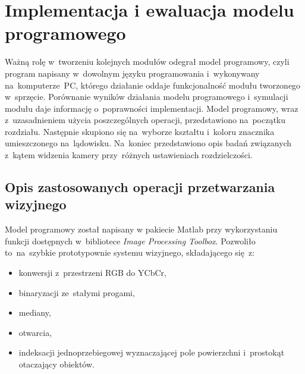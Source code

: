 \chapter{Implementacja i ewaluacja modelu programowego}
\label{cha:implementacja_modelu}

Ważną rolę w~tworzeniu kolejnych modułów odegrał model programowy, czyli program napisany w~dowolnym języku programowania i~wykonywany na~komputerze~PC, którego działanie oddaje funkcjonalność modułu tworzonego w~sprzęcie.
Porównanie wyników działania modelu programowego i~symulacji modułu daje informację o~poprawności implementacji. 
Model programowy, wraz z~uzasadnieniem użycia poszczególnych operacji, przedstawiono na~początku rozdziału.
Następnie skupiono się na~wyborze kształtu i~koloru znacznika umieszczonego na~lądowisku.
Na~koniec przedstawiono opis badań związanych z~kątem widzenia kamery przy~różnych ustawieniach rozdzielczości.

\section{Opis zastosowanych operacji przetwarzania wizyjnego}
\label{sec:opis_operacji}
Model programowy został napisany w pakiecie Matlab przy wykorzystaniu funkcji dostępnych w~bibliotece \textit{Image Processing Toolbox}. 
Pozwoliło to~na~szybkie prototypownie systemu wizyjnego, składającego się~z:
\begin{itemize}
	\item konwersji z~przestrzeni RGB do YCbCr,
	\item binaryzacji ze~stałymi progami,
	\item mediany,
	\item otwarcia,
	\item indeksacji jednoprzebiegowej wyznaczającej pole powierzchni i~prostokąt otaczający obiektów.
\end{itemize}

